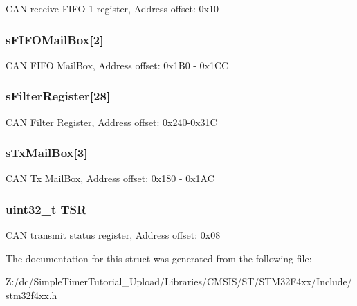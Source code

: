 C\-A\-N receive F\-I\-F\-O 1 register, Address offset\-: 0x10 \hypertarget{struct_c_a_n___type_def_a21b030b34e131f7ef6ea273416449fe4}{
\subsubsection[{s\-F\-I\-F\-O\-Mail\-Box}]{ s\-F\-I\-F\-O\-Mail\-Box\mbox{[}2\mbox{]}}}\label{struct_c_a_n___type_def_a21b030b34e131f7ef6ea273416449fe4}
C\-A\-N F\-I\-F\-O Mail\-Box, Address offset\-: 0x1\-B0 -\/ 0x1\-C\-C \hypertarget{struct_c_a_n___type_def_a31bd74513e6e599319702ad34113bf59}{
\subsubsection[{s\-Filter\-Register}]{ s\-Filter\-Register\mbox{[}28\mbox{]}}}\label{struct_c_a_n___type_def_a31bd74513e6e599319702ad34113bf59}
C\-A\-N Filter Register, Address offset\-: 0x240-\/0x31\-C \hypertarget{struct_c_a_n___type_def_ae37503ab1a7bbd29846f94cdadf0a9ef}{
\subsubsection[{s\-Tx\-Mail\-Box}]{ s\-Tx\-Mail\-Box\mbox{[}3\mbox{]}}}\label{struct_c_a_n___type_def_ae37503ab1a7bbd29846f94cdadf0a9ef}
C\-A\-N Tx Mail\-Box, Address offset\-: 0x180 -\/ 0x1\-A\-C \hypertarget{struct_c_a_n___type_def_a87e3001757a0cd493785f1f3337dd0e8}{
\subsubsection[{T\-S\-R}]{ uint32\-\_\-t T\-S\-R}}\label{struct_c_a_n___type_def_a87e3001757a0cd493785f1f3337dd0e8}
C\-A\-N transmit status register, Address offset\-: 0x08 

The documentation for this struct was generated from the following file\-:\begin{DoxyCompactItemize}
\item 
Z\-:/dc/\-Simple\-Timer\-Tutorial\-\_\-\-Upload/\-Libraries/\-C\-M\-S\-I\-S/\-S\-T/\-S\-T\-M32\-F4xx/\-Include/\hyperlink{stm32f4xx_8h}{stm32f4xx.\-h}\end{DoxyCompactItemize}
